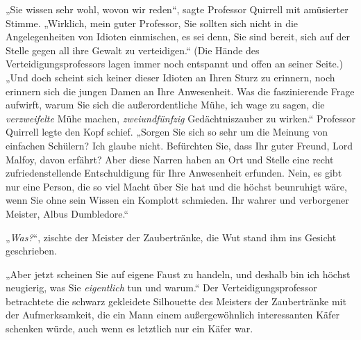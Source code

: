 „Sie wissen sehr wohl, wovon wir reden“, sagte Professor Quirrell mit amüsierter Stimme. „Wirklich, mein guter Professor, Sie sollten sich nicht in die Angelegenheiten von Idioten einmischen, es sei denn, Sie sind bereit, sich auf der Stelle gegen all ihre Gewalt zu verteidigen.“ (Die Hände des Verteidigungsprofessors lagen immer noch entspannt und offen an seiner Seite.) „Und doch scheint sich keiner dieser Idioten an Ihren Sturz zu erinnern, noch erinnern sich die jungen Damen an Ihre Anwesenheit. Was die faszinierende Frage aufwirft, warum Sie sich die außerordentliche Mühe, ich wage zu sagen, die \emph{verzweifelte} Mühe machen, \emph{zweiundfünfzig} Gedächtniszauber zu wirken.“ Professor Quirrell legte den Kopf schief. „Sorgen Sie sich so sehr um die Meinung von einfachen Schülern? Ich glaube nicht. Befürchten Sie, dass Ihr guter Freund, Lord Malfoy, davon erfährt? Aber diese Narren haben an Ort und Stelle eine recht zufriedenstellende Entschuldigung für Ihre Anwesenheit erfunden. Nein, es gibt nur eine Person, die so viel Macht über Sie hat und die höchst beunruhigt wäre, wenn Sie ohne sein Wissen ein Komplott schmieden. Ihr wahrer und verborgener Meister, Albus Dumbledore.“

„\emph{Was?}“, zischte der Meister der Zaubertränke, die Wut stand ihm ins Gesicht geschrieben.

„Aber jetzt scheinen Sie auf eigene Faust zu handeln, und deshalb bin ich höchst neugierig, was Sie \emph{eigentlich} tun und warum.“ Der Verteidigungsprofessor betrachtete die schwarz gekleidete Silhouette des Meisters der Zaubertränke mit der Aufmerksamkeit, die ein Mann einem außergewöhnlich interessanten Käfer schenken würde, auch wenn es letztlich nur ein Käfer war.

